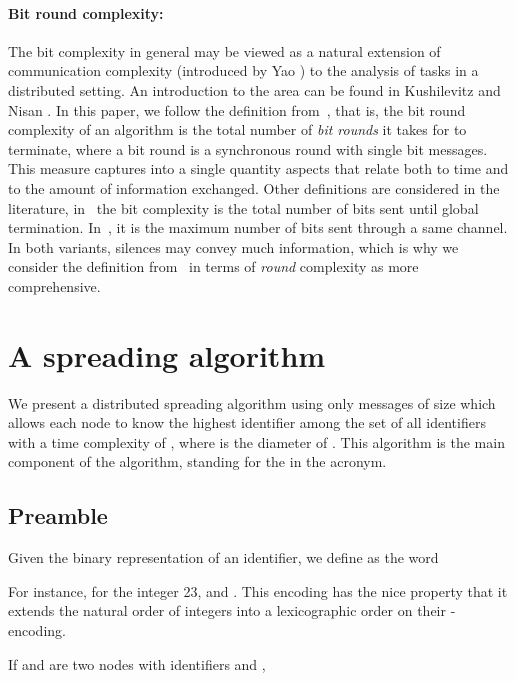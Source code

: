 \documentclass[11pt,envcountsame,letterpaper]{llncs}
\begin{document}
\paragraph{Bit round complexity:}
The bit complexity in general may be viewed as a natural
extension of communication complexity (introduced by Yao \cite{Yao})
to the analysis of tasks in a distributed setting. An introduction to the area can be found in Kushilevitz and Nisan \cite{KN}. 
In this paper, we follow the definition from~\cite{KOSS}, that is, the bit round complexity of an algorithm  is the total number of {\it bit rounds} it takes for  to terminate, where a bit round is a synchronous round with single bit messages. 
This measure captures into a single quantity aspects that relate both to time and to the amount of information exchanged. Other definitions are considered in the literature, in~\cite{BNNN90,BMW,BT90,DMR08} the bit complexity is the total number of bits sent until global termination. In~\cite{sw11}, it is the maximum number of bits sent through a same channel.
In both variants, silences may convey
much information, which is why we consider the definition from~\cite{KOSS} in terms of {\em round} complexity as more comprehensive.





\section{A spreading algorithm}
\label{sec:S}
We present a distributed spreading
algorithm 
using only messages of size   which allows each node to know
the highest identifier among the set of all identifiers with a time
complexity of , where  is the diameter of . This algorithm is the main component of the \STT algorithm, standing for the  in the acronym.

\subsection{Preamble}
 
Given
the binary representation  of an identifier,
we define 
 as the word


For instance, for the integer 23,  and . This encoding has the nice property that it extends the natural order  of integers into a lexicographic order  on their -encoding.



  \label{rem:lexicographic}
If  and  are two nodes with identifiers  and
,
\end{document}
